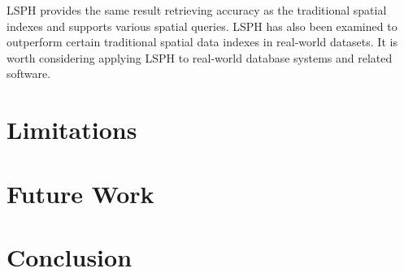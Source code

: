 LSPH provides the same result retrieving accuracy as the traditional spatial indexes and supports various spatial queries. LSPH has also been examined to outperform certain traditional spatial data indexes in real-world datasets. It is worth considering applying LSPH to real-world database systems and related software. 


\section{Limitations}

\section{Future Work}


\section{Conclusion}